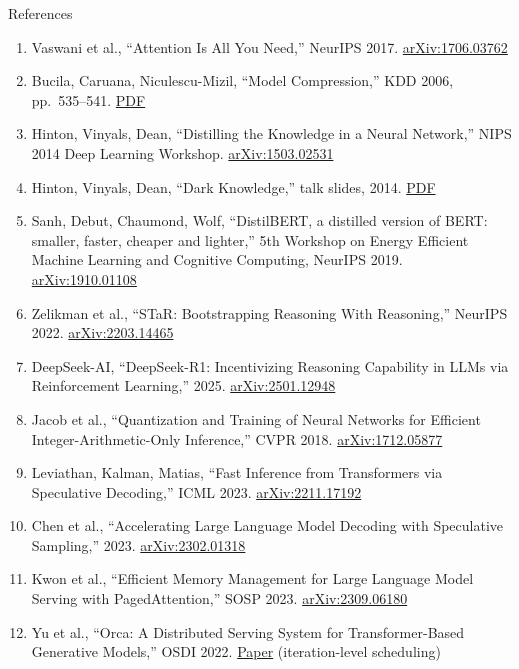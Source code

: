 \begin{frame}[allowframebreaks]{References}
  \footnotesize
  \begin{enumerate}
    \item Vaswani et al., ``Attention Is All You Need,'' NeurIPS 2017. \href{https://arxiv.org/abs/1706.03762}{arXiv:1706.03762}
    \item Bucila, Caruana, Niculescu-Mizil, ``Model Compression,'' KDD 2006, pp.~535--541. \href{https://www.cs.cornell.edu/~caruana/compression.kdd06.pdf}{PDF}
    \item Hinton, Vinyals, Dean, ``Distilling the Knowledge in a Neural Network,'' NIPS 2014 Deep Learning Workshop. \href{https://arxiv.org/abs/1503.02531}{arXiv:1503.02531}
    \item Hinton, Vinyals, Dean, ``Dark Knowledge,'' talk slides, 2014. \href{https://www.ttic.edu/dl/dark14.pdf}{PDF}
    \item Sanh, Debut, Chaumond, Wolf, ``DistilBERT, a distilled version of BERT: smaller, faster, cheaper and lighter,'' 5th Workshop on Energy Efficient Machine Learning and Cognitive Computing, NeurIPS 2019. \href{https://arxiv.org/abs/1910.01108}{arXiv:1910.01108}
    \item Zelikman et al., ``STaR: Bootstrapping Reasoning With Reasoning,'' NeurIPS 2022. \href{https://arxiv.org/abs/2203.14465}{arXiv:2203.14465}
    \item DeepSeek-AI, ``DeepSeek-R1: Incentivizing Reasoning Capability in LLMs via Reinforcement Learning,'' 2025. \href{https://arxiv.org/abs/2501.12948}{arXiv:2501.12948}
    \item Jacob et al., ``Quantization and Training of Neural Networks for Efficient Integer-Arithmetic-Only Inference,'' CVPR 2018. \href{https://arxiv.org/abs/1712.05877}{arXiv:1712.05877}
    \item Leviathan, Kalman, Matias, ``Fast Inference from Transformers via Speculative Decoding,'' ICML 2023. \href{https://arxiv.org/abs/2211.17192}{arXiv:2211.17192}
    \item Chen et al., ``Accelerating Large Language Model Decoding with Speculative Sampling,'' 2023. \href{https://arxiv.org/abs/2302.01318}{arXiv:2302.01318}
    \item Kwon et al., ``Efficient Memory Management for Large Language Model Serving with PagedAttention,'' SOSP 2023. \href{https://arxiv.org/abs/2309.06180}{arXiv:2309.06180}
    \item Yu et al., ``Orca: A Distributed Serving System for Transformer-Based Generative Models,'' OSDI 2022. \href{https://www.usenix.org/conference/osdi22/presentation/yu}{Paper} (iteration-level scheduling)

\end{enumerate}
\end{frame}

